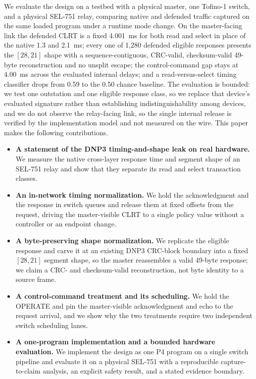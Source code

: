 \documentclass[conference]{IEEEtran}
\begin{document}
We evaluate the design on a testbed with a physical master, one Tofino-1 switch, and a physical
SEL-751 relay, comparing native and defended traffic captured on the same loaded program under a
runtime mode change. On the master-facing link the defended CLRT is a fixed 4.001~ms for both read and
select in place of the native 1.3 and 2.1~ms; every one of 1{,}280 defended eligible responses
presents the $[28,21]$ shape with a sequence-contiguous, CRC-valid, checksum-valid 49-byte
reconstruction and no unsplit escape; the control-command gap stays at 4.00~ms across the evaluated
internal delays; and a read-versus-select timing classifier drops from 0.59 to the 0.50 chance
baseline. The evaluation is bounded: we test one outstation and one eligible response class, so we
replace that device's evaluated signature rather than establishing indistinguishability among
devices, and we do not observe the relay-facing link, so the single internal release is verified by
the implementation model and not measured on the wire. This paper makes the following contributions.

\begin{itemize}
\item \textbf{A statement of the DNP3 timing-and-shape leak on real hardware.} We measure the native
cross-layer response time and segment shape of an SEL-751 relay and show that they separate its read
and select transaction classes.
\item \textbf{An in-network timing normalization.} We hold the acknowledgment and the response in
switch queues and release them at fixed offsets from the request, driving the master-visible CLRT to a
single policy value without a controller or an endpoint change.
\item \textbf{A byte-preserving shape normalization.} We replicate the eligible response and carve it
at an existing DNP3 CRC-block boundary into a fixed $[28,21]$ segment shape, so the master reassembles
a valid 49-byte response; we claim a CRC- and checksum-valid reconstruction, not byte identity to a
source frame.
\item \textbf{A control-command treatment and its scheduling.} We hold the OPERATE and pin the
master-visible acknowledgment and echo to the request arrival, and we show why the two treatments
require two independent switch scheduling lanes.
\item \textbf{A one-program implementation and a bounded hardware evaluation.} We implement the design
as one P4 program on a single switch pipeline and evaluate it on a physical SEL-751 with a
reproducible capture-to-claim analysis, an explicit safety result, and a stated evidence boundary.
\end{itemize}
\end{document}
